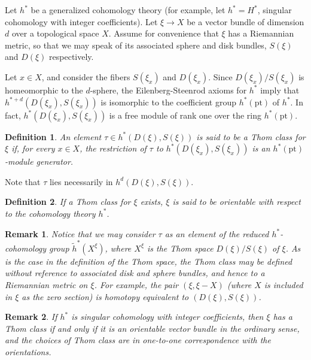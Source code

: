 \documentclass[12pt]{article}
\newtheorem{defn}{Definition}
\newtheorem{rmk}{Remark}
\newcommand{\pt}{\mathrm{pt}}
\begin{document}
Let $h^*$ be a  generalized cohomology theory (for example, let $h^*=H^*$, singular cohomology with integer coefficients). Let $\xi\to X$ be a vector bundle of dimension $d$ over a topological space $X$. Assume for convenience that $\xi$ has a Riemannian metric, so that we may speak of its associated sphere and disk bundles, $S(\xi)$ and $D(\xi)$ respectively. 

\newcommand{\rh}{\tilde{h}}

Let $x\in X$, and consider the fibers $S(\xi_x)$ and $D(\xi_x)$. Since $D(\xi_x)/S(\xi_x)$ is homeomorphic to the $d$-sphere, the Eilenberg-Steenrod axioms for $h^*$ imply that $h^{*+d}(D(\xi_x),S(\xi_x))$ is isomorphic to the coefficient group $h^*(\pt)$ of $h^*$. In fact, $h^*(D(\xi_x),S(\xi_x))$ is a free module of rank one over the ring $h^*(\pt)$.

\begin{defn}
An element $\tau\in h^*(D(\xi),S(\xi))$ is said to be a \emph{Thom class} for $\xi$ if, for every $x\in X$, the restriction of $\tau$ to $h^*(D(\xi_x),S(\xi_x))$ is an $h^*(\pt)$-module generator.
\end{defn}

Note that $\tau$ lies necessarily in $h^d(D(\xi),S(\xi))$.

\begin{defn}
If a Thom class for $\xi$ exists, $\xi$ is said to be \emph{orientable} with respect to the cohomology theory $h^*$. 
\end{defn}

\begin{rmk}
Notice that we may consider $\tau$ as an element of the reduced $h^*$-cohomology group $\rh^*(X^\xi)$, where $X^\xi$ is the Thom space $D(\xi)/S(\xi)$ of $\xi$. As is the case in the definition of the Thom space, the Thom class may be defined without reference to associated disk and sphere bundles, and hence to a Riemannian metric on $\xi$. For example, the pair $(\xi,\xi-X)$ (where $X$ is included in $\xi$ as the zero section) is homotopy equivalent to $(D(\xi),S(\xi))$.
\end{rmk}

\begin{rmk}
If $h^*$ is singular cohomology with integer coefficients, then $\xi$ has a Thom class if and only if it is an orientable vector bundle in the ordinary sense, and the choices of Thom class are in one-to-one correspondence with the orientations.
\end{rmk}
\end{document}
